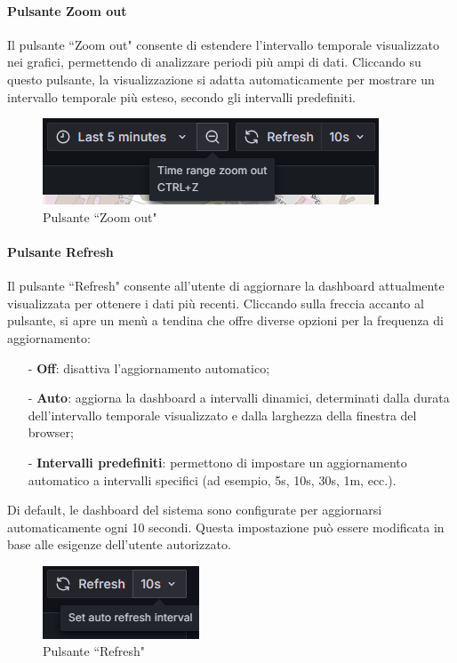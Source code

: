 \documentclass[10pt]{article}
\begin{document}
\begin{justify}
    \paragraph{Pulsante Zoom out}
    Il pulsante ``Zoom out" consente di estendere l'intervallo temporale visualizzato nei grafici, permettendo di analizzare periodi più ampi di dati. Cliccando su questo pulsante, la visualizzazione si adatta automaticamente per mostrare un intervallo temporale più esteso, secondo gli intervalli predefiniti.
    \begin{figure}[H]
    \centering
    \includegraphics[width=0.45\linewidth]{zoomout.png}
    \caption{Pulsante ``Zoom out"}
    \end{figure}
    
    \paragraph{Pulsante Refresh}
    Il pulsante ``Refresh" consente all'utente di aggiornare la dashboard attualmente visualizzata per ottenere i dati più recenti. Cliccando sulla freccia accanto al pulsante, si apre un menù a tendina che offre diverse opzioni per la frequenza di aggiornamento:
    \begin{itemize}
        \item[-] \textbf{Off}: disattiva l'aggiornamento automatico;
        \item[-] \textbf{Auto}: aggiorna la dashboard a intervalli dinamici, determinati dalla durata dell'intervallo temporale visualizzato e dalla larghezza della finestra del browser;
        \item[-] \textbf{Intervalli predefiniti}: permettono di impostare un aggiornamento automatico a intervalli specifici (ad esempio, 5s, 10s, 30s, 1m, ecc.).
    \end{itemize}
    Di default, le dashboard del sistema sono configurate per aggiornarsi automaticamente ogni 10 secondi. Questa impostazione può essere modificata in base alle esigenze dell'utente autorizzato.
    \begin{figure}[H]
    \centering
    \includegraphics[width=0.25\linewidth]{refresh.png}
    \caption{Pulsante ``Refresh"}
    \end{figure}



\end{justify}
\end{document}
